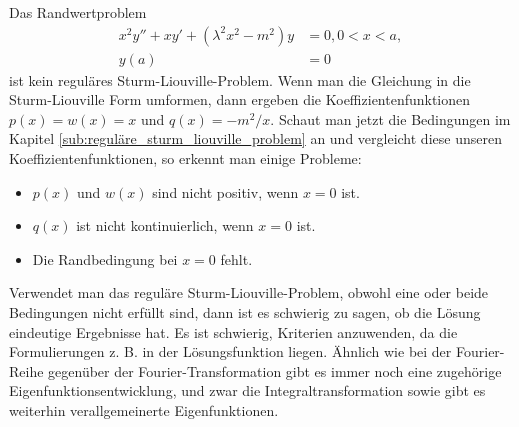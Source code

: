 \begin{beispiel}
	Das Randwertproblem
	\begin{equation}
		\begin{aligned}
		x^2y'' + xy' + (\lambda^2x^2 - m^2)y &= 0, 0<x<a,\\
		y(a) &= 0
		\end{aligned}
	\end{equation}
	ist kein reguläres Sturm-Liouville-Problem.
	Wenn man die Gleichung in die Sturm-Liouville Form umformen, dann ergeben die Koeffizientenfunktionen $p(x) = w(x) = x$ und $q(x) = -m^2/x$.
	Schaut man jetzt die Bedingungen im Kapitel \ref{sub:reguläre_sturm_liouville_problem} an und vergleicht diese unseren Koeffizientenfunktionen, so erkennt man einige Probleme:
	\begin{itemize}
		\item $p(x)$ und $w(x)$ sind nicht positiv, wenn $x = 0$ ist.
		\item $q(x)$ ist nicht kontinuierlich, wenn $x = 0$ ist.
		\item Die Randbedingung bei $x = 0$ fehlt.
	\end{itemize}
\end{beispiel}

Verwendet man das reguläre Sturm-Liouville-Problem, obwohl eine oder beide Bedingungen nicht erfüllt sind, dann ist es schwierig zu sagen, ob die Lösung eindeutige Ergebnisse hat.
Es ist schwierig, Kriterien anzuwenden, da die Formulierungen z. B. in der Lösungsfunktion liegen.
Ähnlich wie bei der Fourier-Reihe gegenüber der Fourier-Transformation gibt es immer noch eine zugehörige Eigenfunktionsentwicklung, und zwar die Integraltransformation sowie gibt es weiterhin verallgemeinerte Eigenfunktionen.

 



